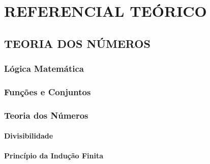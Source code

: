 \chapter{REFERENCIAL TEÓRICO}
\label{cap:fundamentacao-teorica}

  \section{TEORIA DOS NÚMEROS}
  
    \subsection{Lógica Matemática}
    
    \subsection{Funções e Conjuntos}
    
    \subsection{Teoria dos Números}
    
      \subsubsection{Divisibilidade}
      
      \subsubsection{Princípio da Indução Finita}
